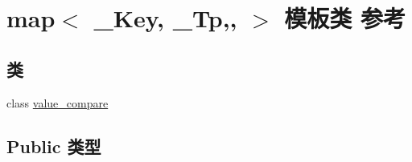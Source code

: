 \hypertarget{classmap}{}\section{map$<$ \+\_\+\+Key, \+\_\+\+Tp,, $>$ 模板类 参考}
\label{classmap}
\subsection*{类}
\begin{DoxyCompactItemize}
\item 
class \hyperlink{classmap_1_1value__compare}{value\+\_\+compare}
\end{DoxyCompactItemize}
\subsection*{Public 类型}
